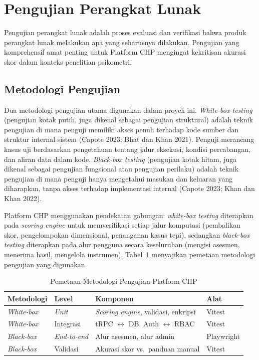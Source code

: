 \section{Pengujian Perangkat Lunak}
\label{sec:pengujian}

Pengujian perangkat lunak adalah proses evaluasi dan verifikasi bahwa produk perangkat lunak melakukan apa yang seharusnya dilakukan. Pengujian yang komprehensif amat penting untuk Platform CHP mengingat kekritisan akurasi skor dalam konteks penelitian psikometri.

\subsection{Metodologi Pengujian}
\label{subsec:metodologi-pengujian}

Dua metodologi pengujian utama digunakan dalam proyek ini. \textit{White-box testing} (pengujian kotak putih, juga dikenal sebagai pengujian struktural) adalah teknik pengujian di mana penguji memiliki akses penuh terhadap kode sumber dan struktur internal sistem (Capote 2023; Bhat dan Khan 2021). Penguji merancang kasus uji berdasarkan pengetahuan tentang jalur eksekusi, kondisi percabangan, dan aliran data dalam kode. \textit{Black-box testing} (pengujian kotak hitam, juga dikenal sebagai pengujian fungsional atau pengujian perilaku) adalah teknik pengujian di mana penguji hanya mengetahui masukan dan keluaran yang diharapkan, tanpa akses terhadap implementasi internal (Capote 2023; Khan dan Khan 2022).

Platform CHP menggunakan pendekatan gabungan: \textit{white-box testing} diterapkan pada \textit{scoring engine} untuk memverifikasi setiap jalur komputasi (pembalikan skor, pengelompokan dimensional, penanganan kasus tepi), sedangkan \textit{black-box testing} diterapkan pada alur pengguna secara keseluruhan (mengisi asesmen, menerima hasil, mengelola instrumen). Tabel~\ref{tab:metodologi-testing} menyajikan pemetaan metodologi pengujian yang digunakan.

\begin{table}[htbp]
  \centering
  \caption{Pemetaan Metodologi Pengujian Platform CHP}
  \label{tab:metodologi-testing}
  \begin{tabularx}{\textwidth}{@{}p{2.5cm} p{2.5cm} X p{2cm}@{}}
    \toprule
    \textbf{Metodologi} & \textbf{Level} & \textbf{Komponen} & \textbf{Alat} \\
    \midrule
    \textit{White-box} & \textit{Unit} & \textit{Scoring engine}, validasi, enkripsi & Vitest \\
    \textit{White-box} & Integrasi & tRPC $\leftrightarrow$ DB, Auth $\leftrightarrow$ RBAC & Vitest \\
    \textit{Black-box} & \textit{End-to-end} & Alur asesmen, alur admin & Playwright \\
    \textit{Black-box} & Validasi & Akurasi skor vs.\ panduan manual & Vitest \\
    \bottomrule
  \end{tabularx}
\end{table}

